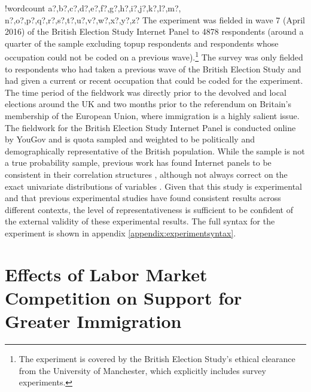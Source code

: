 \documentclass{article}\usepackage[]{graphicx}\usepackage[]{color}
\newcounter{words}
\newenvironment{counted}{%
\setcounter{words}{0}
\SearchList!{wordcount}{\stepcounter{words}}
{a?,b?,c?,d?,e?,f?,g?,h?,i?,j?,k?,l?,m?,
n?,o?,p?,q?,r?,s?,t?,u?,v?,w?,x?,y?,z?}
\UndoBoundary{'}
\SearchOrder{p;}}{%
\StopSearching}
\begin{document}
\begin{counted}
The experiment was fielded in wave 7 (April 2016) of the British Election Study Internet Panel to 4878 respondents (around a quarter of the sample excluding topup respondents and respondents whose occupation could not be coded on a previous wave).\footnote{The experiment is covered by the British Election Study's ethical clearance from the University of Manchester, which explicitly includes survey experiments.} The survey was only fielded to respondents who had taken a previous wave of the British Election Study and had given a current or   recent occupation that could be coded for the experiment. The time period of the fieldwork was directly prior to the devolved and local elections around the UK and two months prior to the referendum on Britain's membership of the European Union, where immigration is a highly salient issue. The fieldwork for the British Election Study Internet Panel is conducted online by YouGov and is quota sampled and weighted to be politically and demographically representative of the British population. While the sample is not a true probability sample, previous work has found Internet panels to be consistent in their correlation structures \autocite{Sanders2007}, although not always correct on the exact univariate distributions of variables \autocite{Mellon2016}. Given that this study is experimental and that previous experimental studies have found consistent results across different contexts, the level of representativeness is sufficient to be confident of the external validity of these experimental results. The full syntax for the experiment is shown in appendix \ref{appendix:experimentsyntax}.

\section{Effects of Labor Market Competition on Support for Greater Immigration}



\end{counted}
\end{document}
